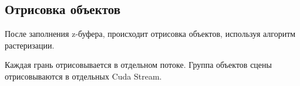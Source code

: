 
\pagebreak

\subsection{Отрисовка объектов}

После заполнения z-буфера, происходит отрисовка объектов, используя алгоритм растеризации.

Каждая грань отрисовывается в отдельном потоке. Группа объектов сцены отрисовываются в отдельных Cuda Stream.

